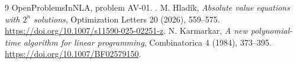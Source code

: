 \begin{thebibliography}{9}
 OpenProblemsInNLA, problem AV-01. .
 M. Hlad\'ik, \emph{Absolute value equations with $2^n$ solutions}, Optimization Letters 20 (2026), 559--575. \url{https://doi.org/10.1007/s11590-025-02251-z}.
 N. Karmarkar, \emph{A new polynomial-time algorithm for linear programming}, Combinatorica 4 (1984), 373--395. \url{https://doi.org/10.1007/BF02579150}.
\end{thebibliography}

